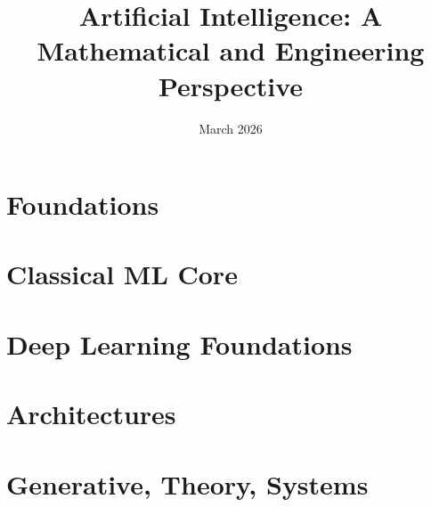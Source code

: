 \documentclass{book}
\title{Artificial Intelligence: A Mathematical and Engineering Perspective}
\author{}
\date{March 2026}
\begin{document}
\maketitle

\chapter{Foundations}







\chapter{Classical ML Core}














\chapter{Deep Learning Foundations}













\chapter{Architectures}









\chapter{Generative, Theory, Systems}




\end{document}

